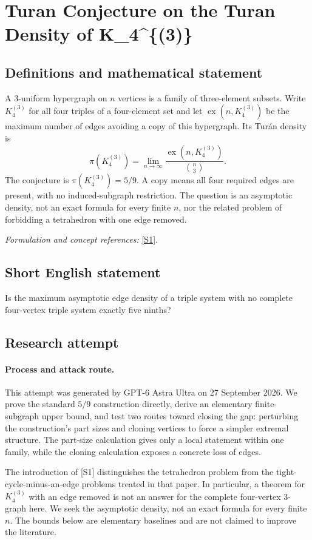 \documentclass[11pt]{article}
\begin{document}
\section*{\texorpdfstring{Turan Conjecture on the Turan Density of K\_4\textasciicircum{}\{(3)\}}{Turan Conjecture on the Turan Density of K\_4\textasciicircum{}\{(3)\}}}\label{30006912}
\subsection{Definitions and mathematical statement}
A $3$-uniform hypergraph on $n$ vertices is a family of three-element subsets. Write $K_4^{(3)}$ for all four triples of a four-element set and let $\operatorname{ex}(n,K_4^{(3)})$ be the maximum number of edges avoiding a copy of this hypergraph. Its Tur\'an density is
\[
 \pi(K_4^{(3)})=\lim_{n\to\infty}
 \frac{\operatorname{ex}(n,K_4^{(3)})}{\binom n3}.
\]
The conjecture is $\pi(K_4^{(3)})=5/9$. A copy means all four required edges are present, with no induced-subgraph restriction. The question is an asymptotic density, not an exact formula for every finite $n$, nor the related problem of forbidding a tetrahedron with one edge removed.
\par\smallskip\textit{Formulation and concept references:} \href{https://lidicky.name/pub/c5-.pdf}{[S1]}.

\subsection{Short English statement}
Is the maximum asymptotic edge density of a triple system with no complete four-vertex triple system exactly five ninths?
\subsection{Research attempt}
\paragraph{Process and attack route.}
This attempt was generated by GPT-6 Astra Ultra on 27 September 2026. We prove the standard $5/9$ construction directly, derive an elementary finite-subgraph upper bound, and test two routes toward closing the gap: perturbing the construction's part sizes and cloning vertices to force a simpler extremal structure. The part-size calculation gives only a local statement within one family, while the cloning calculation exposes a concrete loss of edges.

The introduction of [S1] distinguishes the tetrahedron problem from the tight-cycle-minus-an-edge problems treated in that paper. In particular, a theorem for $K_4^{(3)}$ with an edge removed is not an answer for the complete four-vertex 3-graph here. We seek the asymptotic density, not an exact formula for every finite $n$. The bounds below are elementary baselines and are not claimed to improve the literature.
\end{document}
